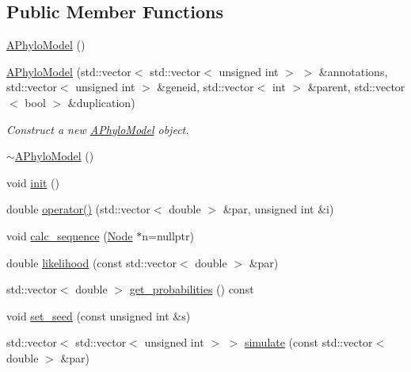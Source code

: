 \subsection*{Public Member Functions}
\begin{DoxyCompactItemize}
\item 
\hyperlink{class_a_phylo_model_a5055699d05235bbefb283298d9dee75d}{A\+Phylo\+Model} ()
\item 
\hyperlink{class_a_phylo_model_a4c0005c106a12f1b11ccd9f5ceac8d9c}{A\+Phylo\+Model} (std\+::vector$<$ std\+::vector$<$ unsigned int $>$ $>$ \&annotations, std\+::vector$<$ unsigned int $>$ \&geneid, std\+::vector$<$ int $>$ \&parent, std\+::vector$<$ bool $>$ \&duplication)
\begin{DoxyCompactList}\small\item\em Construct a new \hyperlink{class_a_phylo_model}{A\+Phylo\+Model} object. \end{DoxyCompactList}\item 
\hyperlink{class_a_phylo_model_ab8b8523e07df92859e5d4289341da72f}{$\sim$\+A\+Phylo\+Model} ()
\item 
void \hyperlink{class_a_phylo_model_a45a7af583f9619bce5d88b15303a73e6}{init} ()
\item 
double \hyperlink{class_a_phylo_model_a9b3390c29ea7a3283e68e9a059b94138}{operator()} (std\+::vector$<$ double $>$ \&par, unsigned int \&i)
\item 
void \hyperlink{class_a_phylo_model_a4a06f02ecd5da1e1b5609fec24318282}{calc\+\_\+sequence} (\hyperlink{class_node}{Node} $\ast$n=nullptr)
\item 
double \hyperlink{class_a_phylo_model_a66fced3b89fe385862318621855fa605}{likelihood} (const std\+::vector$<$ double $>$ \&par)
\item 
std\+::vector$<$ double $>$ \hyperlink{class_a_phylo_model_a3368d03919454f68f0cb5bd888f983a1}{get\+\_\+probabilities} () const
\item 
void \hyperlink{class_a_phylo_model_a5f3faed4bad372764c056d1686508d6e}{set\+\_\+seed} (const unsigned int \&s)
\item 
std\+::vector$<$ std\+::vector$<$ unsigned int $>$ $>$ \hyperlink{class_a_phylo_model_ac75bb5a2f14d104733e2c194ae210986}{simulate} (const std\+::vector$<$ double $>$ \&par)
\end{DoxyCompactItemize}

